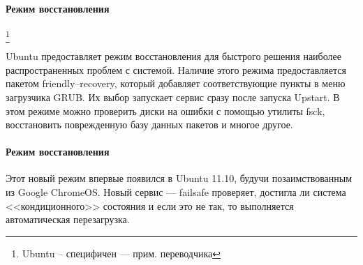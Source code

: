 \paragraph{Режим восстановления} \footnote{Ubuntu -- специфичен --- прим. переводчика}

Ubuntu предоставляет режим восстановления для быстрого решения наиболее распространенных проблем с системой. Наличие этого режима предоставляется пакетом friendly--recovery, который добавляет соответствующие пункты в меню загрузчика GRUB. Их выбор запускает сервис  сразу после запуска Upstart. В этом режиме можно проверить диски на ошибки с помощью утилиты fsck, восстановить поврежденную базу данных пакетов и многое другое.
\paragraph{Режим восстановления}

Этот новый режим впервые появился в Ubuntu 11.10, будучи позаимствованным из Google ChromeOS. Новый сервис --- failsafe проверяет, достигла ли система <<кондиционного>> состояния и если это не так, то выполняется автоматическая перезагрузка. 

